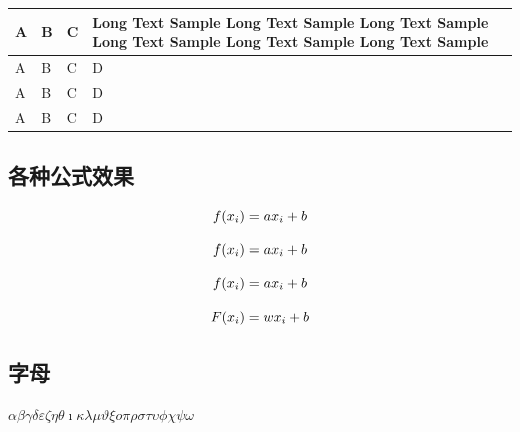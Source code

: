 \documentclass{article}%
\newlength\tablewidth
\begin{document}
%
%

%

%
\begin{center}%
\setlength\tablewidth{\dimexpr (\textwidth -8\tabcolsep)}%
%
%
\begin{tabular}{|p{0.077\tablewidth}<{\centering}|p{0.077\tablewidth}<{\centering}|p{0.077\tablewidth}<{\centering}|p{0.769\tablewidth}<{\centering}|}%
\hline%
\rowcolor{tabletopgray}%
\textbf{A}&\textbf{B}&\textbf{C}&\textbf{Long Text Sample Long Text Sample Long Text Sample Long Text Sample Long Text Sample Long Text Sample }\\%
\hline%
A&B&C&D\\%
\hline%
A&B&C&D\\%
\hline%
A&B&C&D\\%
\hline%
\end{tabular}%
\end{center}%

%
%

%
%
%

%
\subsection{各种公式效果}%

%

%

%
\[%
f(x_i)=ax_i+b\\%
\]%

%
%

%

%
\[%
\\ f(x_i)=ax_i+b\\%
\]%

%
\[%
\\ f(x_i)=ax_i+b\\ \\%
\]%

%
%

%

%
\begin{markquote}%
\[%
F(x_i) = wx_i+b\\%
\]%

%
\end{markquote}%

%
%

%
\subsection{字母}%

%
$\alpha{}$$\beta{}$$\gamma{}$$\delta{}$$\varepsilon{}$$\zeta{}$$\eta{}$$\theta{}$$\imath{}$$\kappa{}$$\lambda{}$$\mu{}$$\vartheta{}$$\xi{}$$o{}$$\pi{}$$\rho{}$$\sigma{}$$\tau{}$$\upsilon{}$$\phi{}$$\chi{}$$\psi{}$$\omega{}$%
\end{document}
